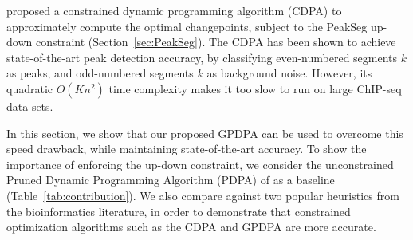 \documentclass{article}
\begin{document}
\citet{HOCKING-PeakSeg} proposed a constrained dynamic programming
algorithm (CDPA) to approximately compute the optimal changepoints,
subject to the PeakSeg up-down constraint
(Section~\ref{sec:PeakSeg}). The CDPA has been shown to achieve
state-of-the-art peak detection accuracy, by classifying even-numbered
segments $k$ as peaks, and odd-numbered segments $k$ as background
noise. However, its quadratic $O(Kn^2)$ time complexity makes it too
slow to run on large ChIP-seq data sets.

In this section, we show that our proposed GPDPA can be used to
overcome this speed drawback, while maintaining state-of-the-art
accuracy. To show the importance of enforcing the up-down constraint,
we consider the unconstrained Pruned Dynamic Programming Algorithm
(PDPA) of \citet{pruned-dp} as a baseline
(Table~\ref{tab:contribution}). We also compare against two popular
heuristics from the bioinformatics literature, in order to demonstrate
that constrained optimization algorithms such as the CDPA and GPDPA
are more accurate.
\end{document}
